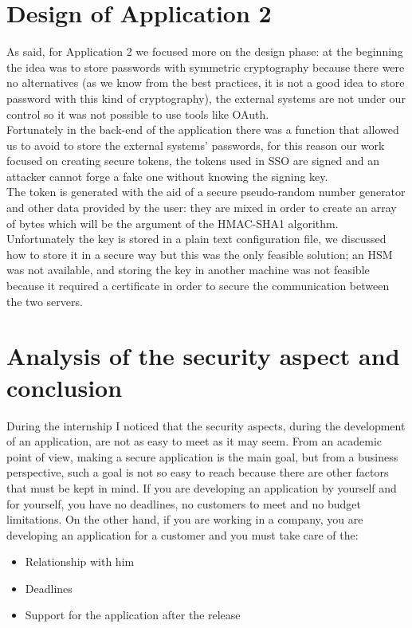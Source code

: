 \section{Design of Application 2}
As said, for Application 2 we focused more on the design phase: at the beginning the idea was to
store passwords with symmetric cryptography because there were no alternatives (as we know from the best practices, it is not a good idea to store password with this kind of cryptography), the external systems are not under our control so
it was not possible to use tools like OAuth.\\
Fortunately in the back-end of the application there was a function that allowed us to avoid to store the external systems' passwords,
for this reason our work focused on creating secure tokens, the tokens used in SSO are signed and an attacker cannot forge a fake one
without knowing the signing key.\\
The token is generated with the aid of a secure pseudo-random number generator and other data provided by the user: they are mixed in order to
create an array of bytes which will be the argument of the HMAC-SHA1 algorithm.\\
Unfortunately the key is stored in a plain text configuration file, we discussed how to store it in a secure way but this was the only feasible
solution; an HSM was not available, and storing the key in another machine was not feasible because it required a certificate in order to
secure the communication between the two servers.\\


\section{Analysis of the security aspect and conclusion}
During the internship I noticed that the security aspects, during the development of an application, are not as easy to meet as it may seem.\newline
From an academic point of view, making a secure application is the main goal, but from a business perspective, such a goal is not so easy to reach because there are other factors that must be kept in mind.\newline
If you are developing an application by yourself and for yourself, you have no deadlines, no customers to meet and no budget limitations.\newline
On the other hand, if you are working in a company, you are developing an application for a customer and you must take care of the:
\begin{itemize}
	\item Relationship with him
	\item Deadlines
	\item Support for the application after the release
\end{itemize}


